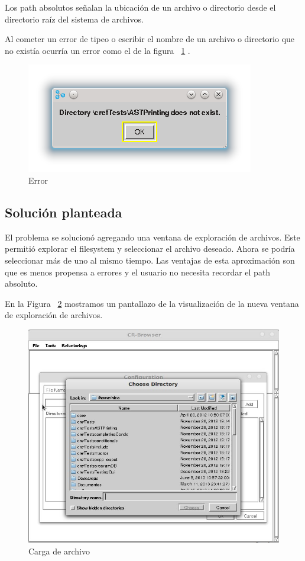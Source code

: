 \documentclass[a4paper,oneside,12pt]{article}
\begin{document}
Los path absolutos señalan la ubicaci\'on de un archivo o directorio desde el directorio ra\'iz del sistema de archivos.

Al cometer un error de tipeo o escribir el nombre de un archivo o directorio que no exist\'ia ocurr\'ia un error como el de la figura ~\ref{error} .

\begin{figure}[h!]
  \centering
    \includegraphics[scale=0.85]{images/codigo_original/error.png}
    \caption{Error}
    \label{error}
\end{figure}

\subsection{Soluci\'on planteada}
El problema se solucion\'o agregando una ventana de exploraci\'on de archivos. Este permiti\'o explorar el filesystem y seleccionar el archivo deseado. Ahora se podr\'ia seleccionar m\'as de uno al mismo tiempo.
Las ventajas de esta aproximaci\'on son que es menos propensa a errores y el usuario no necesita recordar el path absoluto.

En la Figura ~\ref{carga_archivo} mostramos un pantallazo de la visualizaci\'on de la nueva ventana de exploraci\'on de archivos.

\begin{figure}[h!]
  \centering
    \includegraphics[scale=0.50]{images/codigo_modificado/seleccionar_directorio.jpg}
     \caption{Carga de archivo}
     \label{carga_archivo}
\end{figure}
\end{document}

